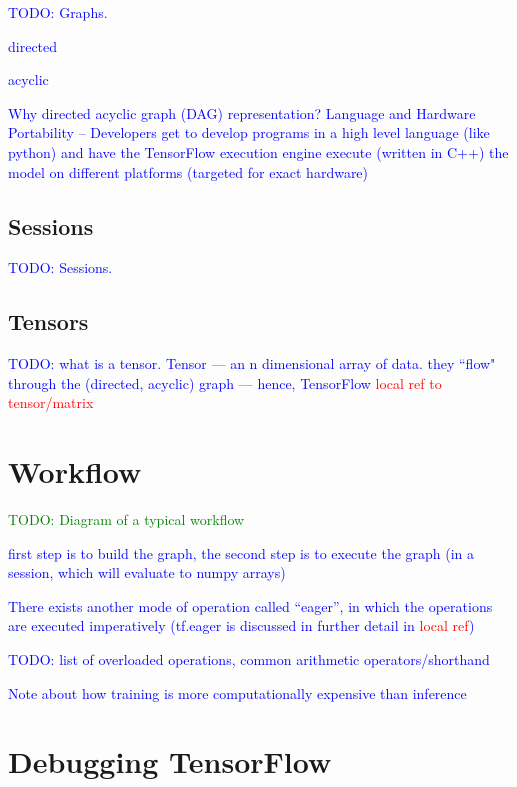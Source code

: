 \textcolor{blue}{TODO: Graphs.}

\textcolor{blue}{directed}

\textcolor{blue}{acyclic}

\textcolor{blue}{Why directed acyclic graph (DAG) representation? Language and Hardware Portability -- Developers get to develop programs in a high level language (like python) and have the TensorFlow execution engine execute (written in C++) the model on different platforms (targeted for exact hardware)}

\subsection{Sessions}

\textcolor{blue}{TODO: Sessions.}

\subsection{Tensors}

\textcolor{blue}{TODO: what is a tensor. Tensor --- an n dimensional array of data. they ``flow" through the (directed, acyclic) graph --- hence, TensorFlow \textcolor{red}{local ref to tensor/matrix}}



\section{Workflow}

\textcolor{green}{TODO: Diagram of a typical workflow}

\textcolor{blue}{first step is to build the graph, the second step is to execute the graph (in a session, which will evaluate to numpy arrays)}

\textcolor{blue}{There exists another mode of operation called ``eager'', in which the operations are executed imperatively (tf.eager is discussed in further detail in \textcolor{red}{local ref})}

\textcolor{blue}{TODO: list of overloaded operations, common arithmetic operators/shorthand}

\textcolor{blue}{Note about how training is more computationally expensive than inference}

\section{Debugging TensorFlow}

